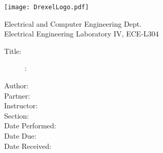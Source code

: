 \begin{titlepage}
	\begin{center}
		\texttt{[image: DrexelLogo.pdf]}
	\end{center}

	\large
	\begin{framed}
		\begin{center}
			Electrical and Computer Engineering Dept. \\
			Electrical Engineering Laboratory IV, ECE-L304 \\
		\end{center}
	\end{framed} \vspace{50pt}

	\begin{description}
		\item[Title:]\labNum: \docTitle
		\item[Author:] \docAuthor
		\item[Partner:] \docCoAuthor
		\item[Instructor:] \ta
		\item[Section:] \labSec
		\item[Date Performed:] \perfDate
		\item[Date Due:] \dueDate
		\item[Date Received:]
	\end{description}
\end{titlepage}
